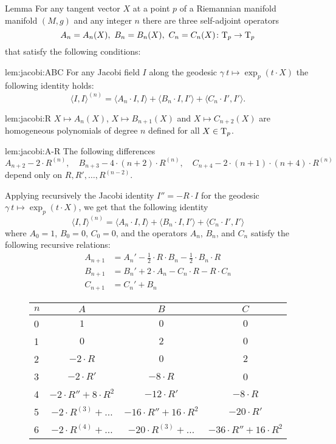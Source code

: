 \documentclass[a4paper,10pt]{article}
\begin{document}
 


\begin{thm}{Lemma}\label{lem:jacobi}
For any tangent vector $X$ at a point $p$ of a Riemannian manifold manifold $(M,g)$ and any integer $n$ there are three self-adjoint operators 
\[A_n=A_n(X),\ B_n=B_n(X),\ C_n=C_n(X)\colon\mathrm{T}_p\to \mathrm{T}_p\]
that satisfy the following conditions:

\begin{subthm}{lem:jacobi:ABC}
For any Jacobi field $I$ along the geodesic $\gamma\:t\mapsto \exp_p(t\cdot X)$ the following identity holds:
\[\langle I,I\rangle^{(n)}
=
\langle A_n\cdot  I,I\rangle+ \langle B_n\cdot I, I'\rangle+\langle C_n\cdot I', I'\rangle.\]
\end{subthm}

\begin{subthm}{lem:jacobi:R}
 $X\mapsto A_{n}(X)$, $X\mapsto B_{n+1}(X)$ and $X\mapsto C_{n+2}(X)$ are homogeneous polynomials of degree $n$ defined for all $X\in \mathrm{T}_p$.
\end{subthm}

\begin{subthm}{lem:jacobi:A-R}
The following differences  
\[A_{n+2}-2\cdot R^{(n)},
\quad 
B_{n+3}-4\cdot(n+2)\cdot R^{(n)},
\quad
C_{n+4}-2\cdot(n+1)\cdot(n+4)\cdot R^{(n)}\]
depend only on $R,R',\dots, R^{(n-2)}$.
\end{subthm}


\end{thm}

Applying recursively the Jacobi identity $I''=-R\cdot I$ for the geodesic $\gamma\:t\mapsto\exp_p(t\cdot X)$, we get that the following identity 
\[\langle I,I\rangle^{(n)}
=
\langle A_n\cdot  I,I\rangle+ \langle B_n\cdot I,I'\rangle+\langle C_n\cdot I',I'\rangle\]
where $A_0=1$, $B_0=0$, $C_0=0$, and the operators $A_n$, $B_n$, and $C_n$ satisfy the following recursive relations:
\begin{align*}
A_{n+1}&=A_n'-\tfrac12\cdot R\cdot B_n-\tfrac12\cdot B_n\cdot R
\\
B_{n+1}&=B_n'+ 2\cdot A_n-C_n\cdot R-R\cdot C_n
\\
C_{n+1}&=C_n'+ B_n
\end{align*}

\renewcommand{\arraystretch}{1.5}
\begin{figure}[!ht]
\centering
\begin{tabular}{ l|c|c|c }
$n$ & $A$ & $B$ & $C$ \\ \hline
0& $1$   &  $0$  & $0$ \\ \hline
1& $0$   &  $2$  & $0$ \\ \hline 
2& $-2\cdot R$ & $0$ & $2$ \\ \hline 
3& $-2\cdot R'$ & $-8\cdot R$ & 0  \\ \hline 
4& $-2\cdot R''+8\cdot R^2$ & $-12\cdot R'$ & $-8\cdot R$  \\ \hline
5& $-2\cdot R^{(3)}+\dots$ 
& $-16\cdot R''+16\cdot R^2$ & $-20\cdot R'$  \\ \hline
6
&$-2\cdot R^{(4)}+\dots$
&$-20\cdot R^{(3)}+\dots$
&$-36\cdot R''+16\cdot R^2$
\\
\end{tabular}
\end{figure} 
\end{document}
